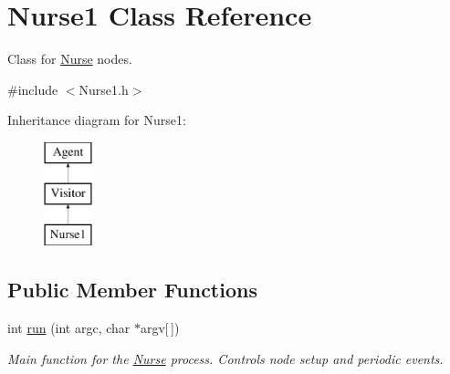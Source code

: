 \hypertarget{classNurse1}{\section{Nurse1 Class Reference}
\label{classNurse1}
}


Class for \hyperlink{classNurse}{Nurse} nodes.  




{\ttfamily \#include $<$Nurse1.\-h$>$}

Inheritance diagram for Nurse1\-:\begin{figure}[H]
\begin{center}
\leavevmode
\includegraphics[height=3.000000cm]{classNurse1}
\end{center}
\end{figure}
\subsection*{Public Member Functions}
\begin{DoxyCompactItemize}
\item 
\hypertarget{classNurse1_aa886de90970d5c54832808c3b6fdef0d}{int \hyperlink{classNurse1_aa886de90970d5c54832808c3b6fdef0d}{run} (int argc, char $\ast$argv\mbox{[}$\,$\mbox{]})}\label{classNurse1_aa886de90970d5c54832808c3b6fdef0d}

\begin{DoxyCompactList}\small\item\em Main function for the \hyperlink{classNurse}{Nurse} process. Controls node setup and periodic events. \end{DoxyCompactList}\end{DoxyCompactItemize}
